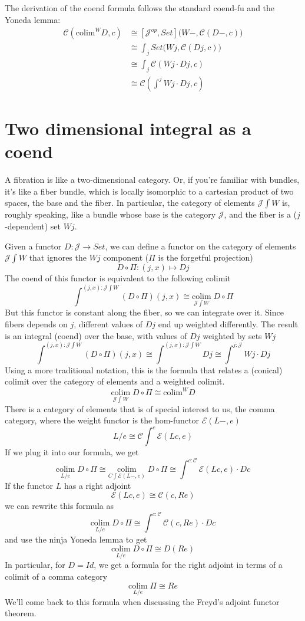 \documentclass[11pt]{amsart}
\begin{document}
The derivation of the coend formula follows the standard coend-fu and the Yoneda lemma:
\begin{align*}
\mathcal{C}(\mbox{colim}^W D, c) & \cong [\mathcal{J}^{op}, Set]\big(W-, \mathcal{C}(D -, c)\big) \\
 &\cong \int_j Set \big(W j, \mathcal{C}(D j, c)\big) \\
 &\cong \int_j \mathcal{C}(W j \cdot D j, c) \\
 &\cong \mathcal{C}(\int^j W j \cdot D j, c)
\end{align*}

\section{Two dimensional integral as a coend}

A fibration is like a two-dimensional category. Or, if you're familiar with bundles, it's like a fiber bundle, which is locally isomorphic to a cartesian product of two spaces, the base and the fiber. In particular, the category of elements $\mathcal{J} \int W$ is, roughly speaking, like a bundle whose base is the category $\mathcal{J}$, and the fiber is a ($j$-dependent) set $W j$. 

Given a functor $D \colon \mathcal{J} \to Set$, we can define a functor on the category of elements $\mathcal{J} \int W$ that ignores the $W j$ component ($\Pi$ is the forgetful projection) 
\[D \circ \Pi \colon (j, x) \mapsto D j\]
The coend of this functor is equivalent to the following colimit
\[\int^{(j, x) \colon \mathcal{J}\int W} (D \circ \Pi) (j, x) \cong \underset{\mathcal{J} \int W}{\mbox{colim}} \; D \circ \Pi  \]
But this functor is constant along the fiber, so we can integrate over it. Since fibers depends on $j$, different values of $D j$ end up weighted differently. The result is an integral (coend) over the base, with values of $D j$ weighted by sets $W j$
\[\int^{(j, x) \colon \mathcal{J}\int W} (D \circ \Pi) (j, x) \cong \int^{(j, x) \colon \mathcal{J}\int W} D j  \cong   \int^{j \colon \mathcal{J}} W j \cdot D j\]
Using a more traditional notation, this is the formula that relates a (conical) colimit over the category of elements and a weighted colimit.
\[\underset{\mathcal{J} \int W}{\mbox{colim}} \; D \circ \Pi  \cong \mbox{colim}^W D\]
There is a category of elements that is of special interest to us, the comma category, where the weight functor is the hom-functor $\mathcal{E}(L-, e)$
\[L/e \cong \mathcal{C}\int^{c} \mathcal{E}(L c, e)\]
If we plug it into our formula, we get
\[\underset{L/e}{\mbox{colim}} \; D \circ \Pi  \cong \underset{C \int \mathcal{E}(L-, e)}{\mbox{colim}} \; D \circ \Pi  \cong \int^{c \colon \mathcal{C}} \mathcal{E}(L c, e) \cdot D c\]
If the functor $L$ has a right adjoint
\[\mathcal{E}(L c, e) \cong \mathcal{C}(c, R e)\]
we can rewrite this formula as
\[\underset{L/e}{\mbox{colim}} \; D \circ \Pi  \cong \int^{c \colon \mathcal{C}} \mathcal{C}(c, R e) \cdot D c\]
and use the ninja Yoneda lemma to get
\[\underset{L/e}{\mbox{colim}} \; D \circ \Pi  \cong D( R e)\]
In particular, for $D = Id$, we get a formula for the right adjoint in terms of a colimit of a comma category
\[\underset{L/e}{\mbox{colim}} \; \Pi  \cong R e\]
We'll come back to this formula when discussing the Freyd's adjoint functor theorem.
\end{document}
